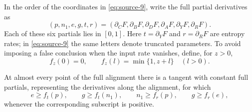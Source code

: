 In the order of the coordinates in \eqref{eq:source-9}, write the
full partial derivatives as
\[
 (p,n_1,e,g,t,r)
 =(\partial_C F,\partial_B F,\partial_D F,
   \partial_A F,\partial_Y F,\partial_R F).
\]
Each of these six partials lies in $[0,1]$.
Here $t=\partial_Y F$ and $r=\partial_R F$ are entropy rates; in
\eqref{eq:source-9} the same letters denote truncated parameters.
To avoid imposing a false conclusion when the
input rate vanishes, define, for $z>0$,
\[
 f_z(0)=0,\qquad f_z(l)=\min\{1,z+l\}\quad(l>0).
\]

\begin{proposition}
\label{proj:scalar}
At almost every point of the full alignment there is a tangent with
constant full partials, representing the derivatives along the
alignment, for which
\begin{equation}
 e\ge f_t(p),\qquad g\ge f_t(n_1),\qquad
 n_1\ge f_r(p),\qquad g\ge f_r(e),
 \label{eq:source-16}
\end{equation}
whenever the corresponding subscript is positive.
\end{proposition}

